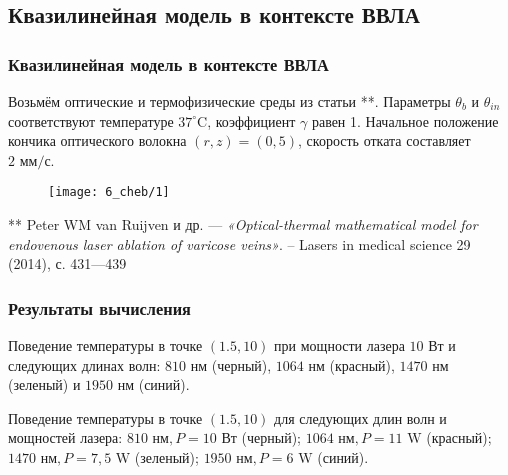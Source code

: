 \subsection{Квазилинейная модель в контексте ВВЛА}
\begin{frame}
    \frametitle{Квазилинейная модель в контексте ВВЛА}
    Возьмём оптические и термофизические среды из статьи **.
    Параметры $\theta_{b}$ и $\theta_{i n}$ соответствуют
    температуре $37^{\circ} \text{C}$, коэффициент $\gamma$ равен 1.
    Начальное положение кончика оптического волокна $(r, z)=(0,5)$,
    скорость отката составляет $2 \text{~мм} / \text{с}$.

    \begin{figure}[h!t]
        \texttt{[image: 6\_cheb/1]}
        \label{fig:4_3:3}
    \end{figure}
    \tiny{** Peter WM van Ruijven и др. — \textit{«Optical-thermal mathematical model for
    endovenous laser ablation of varicose veins»}. -- Lasers in medical science
    29 (2014), с. 431—439}
\end{frame}


\begin{frame}
    \frametitle{Результаты вычисления}
    \begin{minipage}[t]{0.47\linewidth}
        \small{Поведение температуры в точке $(1.5,10)$
            при мощности лазера $10\text{~Вт}$ и следующих длинах волн:
            $810\text{~нм}$ (черный), $1064\text{~нм}$ (красный),
            $1470\text{~нм}$ (зеленый) и $1950\text{~нм}$ (синий).}
    \end{minipage}
    \hfill
    \begin{minipage}[t]{0.47\linewidth}
        \small{Поведение температуры в точке $(1.5,10)$
            для следующих длин волн и мощностей лазера:
            $810 \text{~нм}, P=10 \text{~Вт}$ (черный);
            $1064 \text{~нм}, P=11 \text{~W}$ (красный);
            $1470 \text{~нм}, P=7,5 \text{~W}$ (зеленый);
            $1950 \text{~нм}, P=6 \text{~W}$ (синий).}
    \end{minipage}
\end{frame}

